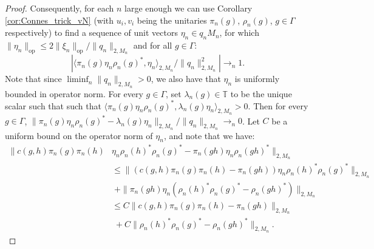 \documentclass[11pt]{amsart}
\DeclareMathOperator{\op}{op}
\newcommand{\T}{{\mathbb{T}}}
\newcommand{\cH}{{\mathcal{H}}}
\theoremstyle{definition}
\theoremstyle{remark}
\theoremstyle{definition}
\newcommand{\admid}[1]{\begingroup\color{orange}Alon: #1\endgroup}
\begin{document}
\begin{proof}
           Consequently, for each $n$ large enough we can use Corollary \ref{cor:Connes_trick_vN} (with $u_i, v_i$ being the unitaries $\pi_n(g)$, $\rho_n(g)$, $g\in \Gamma$ respectively)  to find a sequence of unit vectors $\eta_n \in q_nM_n$, for which $\| \eta_n \|_{\op} \leq 2 \|\xi_n \|_{\op} / \| q_n \|_{2,M_n}$ and for all $g \in \Gamma$:
           $$|\langle \pi_n(g) \eta_n\rho_n(g)^*, \eta_n \rangle_{2,M_n} / \|q_n \|_{2,M_n}^2|  \to _n 1.$$ 
           Note that since $\liminf_{n} \| q_n \|_{2,M_n} > 0$, we also have that $\eta_n$ is uniformly bounded in operator norm.
        For every $g \in \Gamma$, set $\lambda_n(g) \in \T$ to  be the unique scalar such that such that $\langle \pi_n(g) \eta_n\rho_n(g)^*, \lambda_n(g)\eta_n \rangle_{2,M_n} > 0$.
        Then for every $g \in \Gamma$, $\| \pi_n(g)\eta_n \rho_n(g)^* - \lambda_n(g)\eta_n \|_{2,M_n} / \| q_n\|_{2,M_n} \to_n 0$.
        Let $C$ be a uniform bound on the operator norm of $\eta_n$,  and note that we have:
        \begin{align*}
            \| c(g,h)\pi_n(g)\pi_n(h)&\eta_n \rho_n(h)^*\rho_n(g)^* - \pi_n(gh) \eta_n \rho_n(gh)^*\|_{2,M_n} \\
            & \leq \|(c(g,h)\pi_n(g)\pi_n(h) - \pi_n(gh)) \eta_n \rho_n(h)^*\rho_n(g)^* \|_{2,M_n} \\
            & \; + \| \pi_n(gh) \eta_n (\rho_n(h)^*\rho_n(g)^* -\rho_n(gh)^*) \|_{2,M_n}\\
            & \leq C\|c(g,h)\pi_n(g)\pi_n(h) - \pi_n(gh)\|_{2,M_n} \\
            & \; + C\|  \rho_n(h)^*\rho_n(g)^* -\rho_n(gh)^* \|_{2,M_n}.

\end{align*}
\end{proof}
\end{document}
